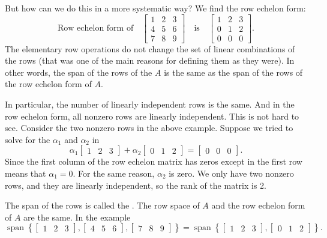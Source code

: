 But how can we do this in a more systematic way?  We find the row echelon
form:
\begin{equation*}
\text{Row echelon form of}
\quad
\begin{bmatrix}
1 & 2 & 3 \\
4 & 5 & 6  \\
7 & 8 & 9
\end{bmatrix}
\quad
\text{is}
\quad
\begin{bmatrix}
1 & 2 & 3 \\
0 & 1 & 2  \\
0 & 0 & 0
\end{bmatrix} .
\end{equation*}
The elementary row operations do not change the set of linear combinations of
the rows (that was one of the main reasons for defining them as they were).
In other words, the span of the rows of the $A$ is the same
as the span of the rows of the row echelon form of $A$.

In particular, the number of linearly independent rows is the same.
And in the row echelon form, all nonzero rows are linearly independent.
This is not hard to see.
Consider the two nonzero rows in the above example.
Suppose we 
tried to solve for the $\alpha_1$ and $\alpha_2$
in
\begin{equation*}
\alpha_1
\begin{bmatrix}
1 & 2 & 3
\end{bmatrix} 
+
\alpha_2
\begin{bmatrix}
0 & 1 & 2 
\end{bmatrix} =
\begin{bmatrix}
0 & 0 & 0
\end{bmatrix} .
\end{equation*}
Since the first column
of the row echelon matrix has zeros except in the first row means that
$\alpha_1 = 0$.  For the same reason, $\alpha_2$ is zero.
We only have two nonzero rows,
and they are linearly independent, so the rank of the matrix is 2.

The span of the rows is called the \emph{}.  The
row space of $A$ and the row echelon form of $A$ are the same.  In the
example
\begin{equation*}
\operatorname{span}
\left\{
\begin{bmatrix}
1 & 2 & 3
\end{bmatrix}
,
\begin{bmatrix}
4 & 5 & 6
\end{bmatrix}
,
\begin{bmatrix}
7 & 8 & 9
\end{bmatrix}
\right\}
=
\operatorname{span}
\left\{
\begin{bmatrix}
1 & 2 & 3
\end{bmatrix}
,
\begin{bmatrix}
0 & 1 & 2
\end{bmatrix}
\right\} .
\end{equation*}

